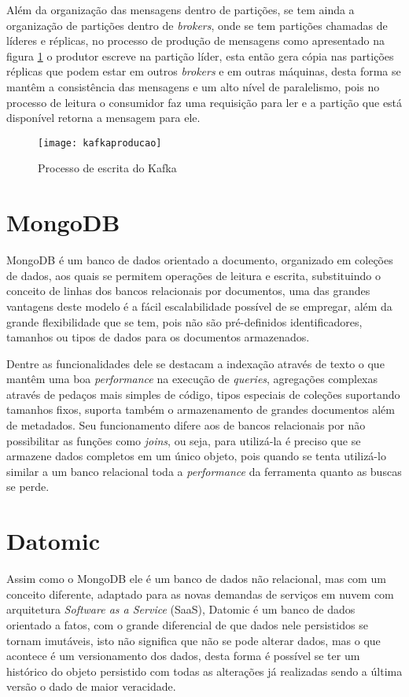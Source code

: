 Além da organização das mensagens dentro de partições, se tem ainda a organização de partições dentro de \textit{brokers}, onde se tem partições  chamadas de líderes e réplicas, no processo de produção de mensagens como apresentado na figura \ref{fig:kafkaproducao} o produtor escreve na partição líder, esta então gera cópia nas partições réplicas que podem estar em outros \textit{brokers} e em outras máquinas, desta forma se mantêm a consistência das mensagens e um alto nível de paralelismo, pois no processo de leitura o consumidor faz uma requisição para ler e a partição que está disponível retorna a mensagem para ele.~\cite{kafka}

\begin{figure}[!h]
\caption{\label{fig:kafkaproducao} Processo de escrita do Kafka}
\begin{center}
\texttt{[image: kafkaproducao]}
\end{center}
\end{figure}

\section{MongoDB}
MongoDB é um banco de dados orientado a documento, organizado em coleções de dados, aos quais se permitem operações de leitura e escrita, substituindo o conceito de linhas dos bancos relacionais por documentos, uma das grandes vantagens deste modelo é a fácil escalabilidade possível de se empregar, além da grande flexibilidade que se tem, pois não são pré-definidos identificadores, tamanhos ou tipos de dados para os documentos armazenados.

Dentre as funcionalidades dele se destacam a indexação através de texto o que mantêm uma boa \textit{performance} na execução de \textit{queries}, agregações complexas através de pedaços mais simples de código, tipos especiais de coleções suportando tamanhos fixos, suporta também o armazenamento de grandes documentos além de metadados. Seu funcionamento difere aos de bancos relacionais por não possibilitar as funções como \textit{joins}, ou seja, para utilizá-la é preciso que se armazene dados completos em um único objeto, pois quando se tenta utilizá-lo similar a um banco relacional toda a \textit{performance} da ferramenta quanto as buscas se perde.~\cite{chodorow2013mongodb}

\section{Datomic}
Assim como o MongoDB ele é um banco de dados não relacional, mas com um conceito diferente, adaptado para as novas demandas de serviços em nuvem com arquitetura \textit{Software as a Service} (SaaS), Datomic é um banco de dados orientado a fatos, com o grande diferencial de que dados nele persistidos se tornam imutáveis, isto não significa que não se pode alterar dados, mas o que acontece é um versionamento dos dados, desta forma é possível se ter um histórico do objeto persistido com todas as alterações já realizadas sendo a última versão o dado de maior veracidade.  

